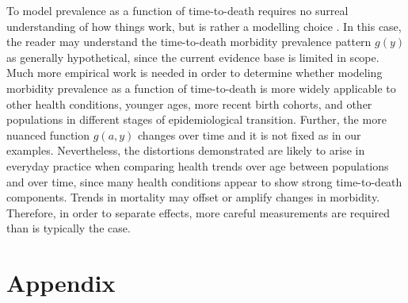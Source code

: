 \documentclass[11pt,oneside,a4paper]{article} %
\begin{document}
To model prevalence as a function of
time-to-death requires no surreal understanding of how things work, but is
rather a modelling choice \citep{wolf2015disability}. In this case, the reader may understand the
time-to-death morbidity prevalence pattern $g(y)$ as generally hypothetical,
since the current evidence base is limited in scope. Much more
empirical work is needed in order to determine whether modeling morbidity
prevalence as a function of time-to-death is more widely applicable to
other health conditions, younger ages, more recent birth
cohorts, and other populations in different stages of epidemiological
transition. Further, the more nuanced function $g(a,y)$ changes over time and it
is not fixed as in our examples. Nevertheless, the distortions demonstrated are likely to arise in everyday practice when comparing health trends over age between populations and over time, since many health conditions appear to show strong time-to-death components. Trends in mortality may offset or amplify changes in morbidity.
Therefore, in order to separate effects, more careful measurements are required
than is typically the case. 

\section{Appendix}
\end{document}
